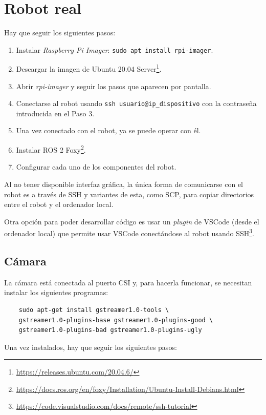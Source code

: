 \section{Robot real}
\label{subsec:anexoconfig}

Hay que seguir los siguientes pasos: 

\begin{enumerate}
	\item Instalar \textit{Raspberry Pi Imager}: \verb|sudo apt install rpi-imager|.
	\item Descargar la imagen de Ubuntu 20.04 Server\footnote{\url{https://releases.ubuntu.com/20.04.6/}}.
	\item Abrir \textit{rpi-imager} y seguir los pasos que aparecen por pantalla.
	\item Conectarse al robot usando \verb|ssh usuario@ip_dispositivo| con la contraseña introducida en el Paso 3.
	\item Una vez conectado con el robot, ya se puede operar con él.
	\item Instalar ROS 2 Foxy\footnote{\url{https://docs.ros.org/en/foxy/Installation/Ubuntu-Install-Debians.html}}.
	\item Configurar cada uno de los componentes del robot.
\end{enumerate}

Al no tener disponible interfaz gráfica, la única forma de comunicarse con el robot es a través de SSH y variantes de esta, como SCP, para copiar directorios entre el robot y el ordenador local.

Otra opción para poder desarrollar código es usar un \textit{plugin} de VSCode (desde el ordenador local) que permite usar VSCode conectándose al robot usando SSH\footnote{\url{https://code.visualstudio.com/docs/remote/ssh-tutorial}}.

\subsection{Cámara}
\label{subsec:anexocamara}

La cámara está conectada al puerto CSI y, para hacerla funcionar, se necesitan  instalar los siguientes programas: 

\begin{verbatim}
	sudo apt-get install gstreamer1.0-tools \ 
	gstreamer1.0-plugins-base gstreamer1.0-plugins-good \ 
	gstreamer1.0-plugins-bad gstreamer1.0-plugins-ugly
\end{verbatim}

Una vez instalados, hay que seguir los siguientes pasos: 

